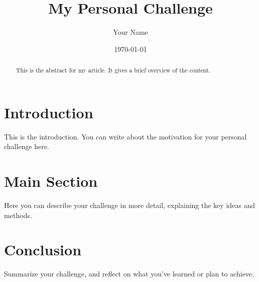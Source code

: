 \documentclass{article}
\title{My Personal Challenge}
\author{Your Name}
\date{\today}
\begin{document}
\maketitle

\begin{abstract}
This is the abstract for my article. It gives a brief overview of the content.
\end{abstract}

\section{Introduction}
This is the introduction. You can write about the motivation for your personal challenge here.

\section{Main Section}
Here you can describe your challenge in more detail, explaining the key ideas and methods.

\section{Conclusion}
Summarize your challenge, and reflect on what you've learned or plan to achieve.
\end{document}
